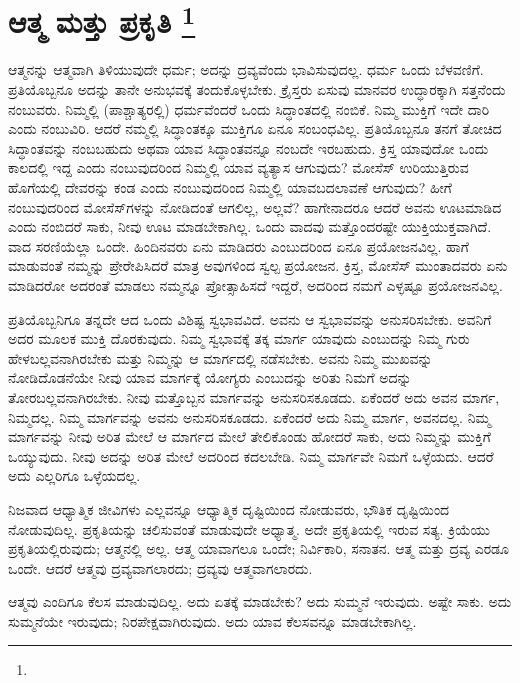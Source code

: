 
\vspace{-0.5cm}

\chapter[ಆತ್ಮ ಮತ್ತು ಪ್ರಕೃತಿ ]{ಆತ್ಮ ಮತ್ತು ಪ್ರಕೃತಿ \protect\footnote{}}

ಆತ್ಮನನ್ನು ಆತ್ಮವಾಗಿ ತಿಳಿಯುವುದೇ ಧರ್ಮ; ಅದನ್ನು ದ್ರವ್ಯವೆಂದು ಭಾವಿಸುವುದಲ್ಲ. ಧರ್ಮ ಒಂದು ಬೆಳವಣಿಗೆ. ಪ್ರತಿಯೊಬ್ಬನೂ ಅದನ್ನು ತಾನೇ ಅನುಭವಕ್ಕೆ ತಂದುಕೊಳ್ಳಬೇಕು. ಕ್ರೈಸ್ತರು ಏಸುವು ಮಾನವರ ಉದ್ಧಾರಕ್ಕಾಗಿ ಸತ್ತನೆಂದು ನಂಬುವರು. ನಿಮ್ಮಲ್ಲಿ (ಪಾಶ್ಚಾತ್ಯರಲ್ಲಿ) ಧರ್ಮವೆಂದರೆ ಒಂದು ಸಿದ್ಧಾಂತದಲ್ಲಿ ನಂಬಿಕೆ. ನಿಮ್ಮ ಮುಕ್ತಿಗೆ ಇದೇ ದಾರಿ ಎಂದು ನಂಬುವಿರಿ. ಆದರೆ ನಮ್ಮಲ್ಲಿ ಸಿದ್ಧಾಂತಕ್ಕೂ ಮುಕ್ತಿಗೂ ಏನೂ ಸಂಬಂಧವಿಲ್ಲ. ಪ್ರತಿಯೊಬ್ಬನೂ ತನಗೆ ತೋಚಿದ ಸಿದ್ಧಾಂತವನ್ನು ನಂಬಬಹುದು ಅಥವಾ ಯಾವ ಸಿದ್ಧಾಂತವನ್ನೂ ನಂಬದೇ ಇರಬಹುದು. ಕ್ರಿಸ್ತ ಯಾವುದೋ ಒಂದು ಕಾಲದಲ್ಲಿ ಇದ್ದ ಎಂದು ನಂಬುವುದರಿಂದ ನಿಮ್ಮಲ್ಲಿ ಯಾವ ವ್ಯತ್ಯಾಸ ಆಗುವುದು? ಮೋಸೆಸ್​ ಉರಿಯುತ್ತಿರುವ ಹೊಗೆಯಲ್ಲಿ ದೇವರನ್ನು ಕಂಡ ಎಂದು ನಂಬುವುದರಿಂದ ನಿಮ್ಮಲ್ಲಿ ಯಾವ\break ಬದಲಾವಣೆ ಆಗುವುದು? ಹೀಗೆ ನಂಬುವುದರಿಂದ ಮೋಸೆಸ್​ಗಳನ್ನು ನೋಡಿದಂತೆ ಆಗಲಿಲ್ಲ, ಅಲ್ಲವೆ? ಹಾಗೇನಾದರೂ ಆದರೆ ಅವನು ಊಟಮಾಡಿದ ಎಂದು ನಂಬಿದರೆ ಸಾಕು, ನೀವು ಊಟ ಮಾಡಬೇಕಾಗಿಲ್ಲ. ಒಂದು ವಾದವು ಮತ್ತೊಂದರಷ್ಟೇ ಯುಕ್ತಿಯುಕ್ತವಾಗಿದೆ. ವಾದ ಸರಣಿಯೆಲ್ಲಾ ಒಂದೇ. ಹಿಂದಿನವರು ಏನು ಮಾಡಿದರು ಎಂಬುದರಿಂದ ಏನೂ ಪ್ರಯೋಜನವಿಲ್ಲ. ಹಾಗೆ ಮಾಡುವಂತೆ ನಮ್ಮನ್ನು ಪ್ರೇರೇಪಿಸಿದರೆ ಮಾತ್ರ ಅವುಗಳಿಂದ ಸ್ವಲ್ಪ ಪ್ರಯೋಜನ. ಕ್ರಿಸ್ತ, ಮೋಸೆಸ್​ ಮುಂತಾದವರು ಏನು ಮಾಡಿದರೋ ಅದರಂತೆ ಮಾಡಲು ನಮ್ಮನ್ನೂ ಪ್ರೋತ್ಸಾಹಿಸದೆ ಇದ್ದರೆ, ಅದರಿಂದ ನಮಗೆ ಎಳ್ಳಷ್ಟೂ ಪ್ರಯೋಜನವಿಲ್ಲ.

ಪ್ರತಿಯೊಬ್ಬನಿಗೂ ತನ್ನದೇ ಆದ ಒಂದು ವಿಶಿಷ್ಟ ಸ್ವಭಾವವಿದೆ. ಅವನು ಆ ಸ್ವಭಾವವನ್ನು ಅನುಸರಿಸಬೇಕು. ಅವನಿಗೆ ಅದರ ಮೂಲಕ ಮುಕ್ತಿ ದೊರಕುವುದು. ನಿಮ್ಮ ಸ್ವಭಾವಕ್ಕೆ ತಕ್ಕ ಮಾರ್ಗ ಯಾವುದು ಎಂಬುದನ್ನು ನಿಮ್ಮ ಗುರು ಹೇಳಬಲ್ಲವನಾಗಿರಬೇಕು ಮತ್ತು ನಿಮ್ಮನ್ನು ಆ ಮಾರ್ಗದಲ್ಲಿ ನಡೆಸಬೇಕು. ಅವನು ನಿಮ್ಮ ಮುಖವನ್ನು ನೋಡಿದೊಡನೆಯೇ ನೀವು ಯಾವ ಮಾರ್ಗಕ್ಕೆ ಯೋಗ್ಯರು ಎಂಬುದನ್ನು ಅರಿತು ನಿಮಗೆ ಅದನ್ನು ತೋರಬಲ್ಲವನಾಗಿರಬೇಕು. ನೀವು ಮತ್ತೊಬ್ಬನ ಮಾರ್ಗವನ್ನು ಅನುಸರಿಸಕೂಡದು. ಏಕೆಂದರೆ ಅದು ಅವನ ಮಾರ್ಗ, ನಿಮ್ಮದಲ್ಲ. ನಿಮ್ಮ ಮಾರ್ಗವನ್ನು ಅವನು ಅನುಸರಿಸಕೂಡದು. ಏಕೆಂದರೆ ಅದು ನಿಮ್ಮ ಮಾರ್ಗ, ಅವನದಲ್ಲ. ನಿಮ್ಮ ಮಾರ್ಗವನ್ನು ನೀವು ಅರಿತ ಮೇಲೆ ಆ ಮಾರ್ಗದ ಮೇಲೆ ತೇಲಿಕೊಂಡು ಹೋದರೆ ಸಾಕು, ಅದು ನಿಮ್ಮನ್ನು ಮುಕ್ತಿಗೆ ಒಯ್ಯುವುದು. ನೀವು ಅದನ್ನು ಅರಿತ ಮೇಲೆ ಅದರಿಂದ ಕದಲಬೇಡಿ. ನಿಮ್ಮ ಮಾರ್ಗವೇ ನಿಮಗೆ ಒಳ್ಳೆಯದು. ಆದರೆ ಅದು ಎಲ್ಲರಿಗೂ ಒಳ್ಳೆಯದಲ್ಲ.

ನಿಜವಾದ ಆಧ್ಯಾತ್ಮಿಕ ಜೀವಿಗಳು ಎಲ್ಲವನ್ನೂ ಆಧ್ಯಾತ್ಮಿಕ ದೃಷ್ಟಿಯಿಂದ ನೋಡುವರು, ಭೌತಿಕ ದೃಷ್ಟಿಯಿಂದ ನೋಡುವುದಿಲ್ಲ. ಪ್ರಕೃತಿಯನ್ನು ಚಲಿಸುವಂತೆ ಮಾಡುವುದೇ ಅಧ್ಯಾತ್ಮ. ಅದೇ ಪ್ರಕೃತಿಯಲ್ಲಿ ಇರುವ ಸತ್ಯ. ಕ್ರಿಯೆಯು ಪ್ರಕೃತಿಯಲ್ಲಿರುವುದು; ಆತ್ಮನಲ್ಲಿ ಅಲ್ಲ. ಆತ್ಮ ಯಾವಾಗಲೂ ಒಂದೇ; ನಿರ್ವಿಕಾರಿ, ಸನಾತನ. ಆತ್ಮ ಮತ್ತು ದ್ರವ್ಯ ಎರಡೂ ಒಂದೇ. ಆದರೆ ಆತ್ಮವು ದ್ರವ್ಯವಾಗಲಾರದು; ದ್ರವ್ಯವು ಆತ್ಮವಾಗಲಾರದು.

ಆತ್ಮವು ಎಂದಿಗೂ ಕೆಲಸ ಮಾಡುವುದಿಲ್ಲ. ಅದು ಏತಕ್ಕೆ ಮಾಡಬೇಕು? ಅದು ಸುಮ್ಮನೆ ಇರುವುದು. ಅಷ್ಟೇ ಸಾಕು. ಅದು ಸುಮ್ಮನೆಯೇ ಇರುವುದು; ನಿರಪೇಕ್ಷವಾಗಿರುವುದು. ಅದು ಯಾವ ಕೆಲಸವನ್ನೂ ಮಾಡಬೇಕಾಗಿಲ್ಲ.

